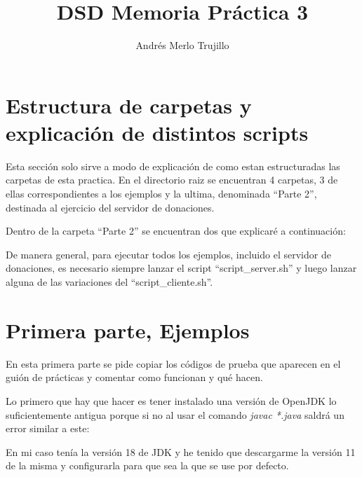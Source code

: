 \documentclass{article}
\title{DSD Memoria Práctica 3}
\author{Andrés Merlo Trujillo}
\date{}
\begin{document}
\maketitle

\section{Estructura de carpetas y explicación de distintos scripts}
Esta sección solo sirve a modo de explicación de como estan estructuradas las carpetas de esta practica. En el directorio raiz se encuentran 4 carpetas, 3 de ellas correspondientes a los ejemplos y la ultima, denominada ``Parte 2'', destinada al ejercicio del servidor de donaciones.

Dentro de la carpeta ``Parte 2'' se encuentran dos que explicaré a continuación:



De manera general, para ejecutar todos los ejemplos, incluido el servidor de donaciones, es necesario siempre lanzar el script ``script\_server.sh'' y luego lanzar alguna de las variaciones del ``script\_cliente.sh''.



\section{Primera parte, Ejemplos}
En esta primera parte se pide copiar los códigos de prueba que aparecen en el guión de prácticas y comentar como funcionan y qué hacen.

\bigskip

Lo primero que hay que hacer es tener instalado una versión de OpenJDK lo suficientemente antigua porque si no al usar el comando \textit{javac *.java} saldrá un error similar a este:


En mi caso tenía la versión 18 de JDK y he tenido que descargarme la versión 11 de la misma y configurarla para que sea la que se use por defecto.
\end{document}
